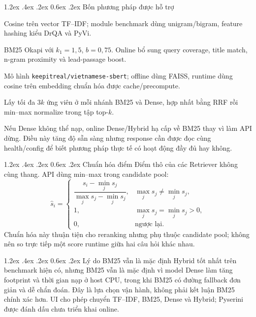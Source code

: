 \documentclass[12pt,a4paper,oneside]{report}
\makeatletter
\renewcommand\section{\@startsection {section}{1}{\z@}%
  {1.2ex \@plus .4ex \@minus .2ex}%
  {0.6ex \@plus .2ex}%
  {\normalfont\Large\bfseries}}
\newcommand{\code}[1]{\texttt{#1}}
\makeatother
\begin{document}
\section{Bốn phương pháp được hỗ trợ}
\begin{description}[leftmargin=3.3cm,style=nextline]
  \item[TF--IDF] Cosine trên vector TF--IDF; module benchmark dùng unigram/bigram,
  feature hashing kiểu DrQA và PyVi.
  \item[BM25] BM25 Okapi với $k_1=1{,}5$, $b=0{,}75$. Online bổ sung query coverage,
  title match, n-gram proximity và lead-passage boost.
  \item[Dense] Mô hình \code{keepitreal/vietnamese-sbert}; offline dùng FAISS, runtime
  dùng cosine trên embedding chuẩn hóa được cache/precompute.
  \item[Hybrid] Lấy tối đa $3k$ ứng viên ở mỗi nhánh BM25 và Dense, hợp nhất bằng RRF
  rồi min--max normalize trong tập top-$k$.
\end{description}

Nếu Dense không thể nạp, online Dense/Hybrid hạ cấp về BM25 thay vì làm API dừng.
Điều này tăng độ sẵn sàng nhưng response cần được đọc cùng health/config để biết phương
pháp thực tế có hoạt động đầy đủ hay không.

\section{Chuẩn hóa điểm}
Điểm thô của các Retriever không cùng thang. API dùng min--max trong candidate pool:
\begin{equation}
  \hat{s}_i=\begin{cases}
    \dfrac{s_i-\min_j s_j}{\max_j s_j-\min_j s_j}, & \max_j s_j\ne\min_j s_j,\\[6pt]
    1, & \max_j s_j=\min_j s_j>0,\\
    0, & \text{ngược lại.}
  \end{cases}
\end{equation}
Chuẩn hóa này thuận tiện cho reranking nhưng phụ thuộc candidate pool; không nên so
trực tiếp một score runtime giữa hai câu hỏi khác nhau.

\section{Lý do BM25 vẫn là mặc định}
Hybrid tốt nhất trên benchmark hiện có, nhưng BM25 vẫn là mặc định vì model Dense
làm tăng footprint và thời gian nạp ở host CPU, trong khi BM25 có đường fallback đơn
giản và dễ chẩn đoán. Đây là lựa chọn vận hành, không phải kết luận BM25 chính xác hơn.
UI cho phép chuyển TF--IDF, BM25, Dense và Hybrid; Pyserini được đánh dấu chưa triển
khai online.
\end{document}
